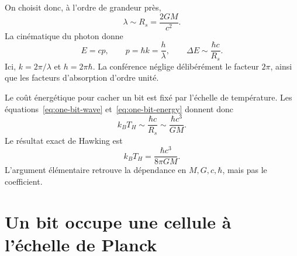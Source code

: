 \begin{classroomqa}
\end{classroomqa}

On choisit donc, à l’ordre de grandeur près,
\begin{equation}
\lambda\sim R_s=\frac{2GM}{c^2}.
\label{eq:one-bit-wave}
\end{equation}
La cinématique du photon donne
\begin{equation}
E=cp,
\qquad
p=\hbar k=\frac{h}{\lambda},
\qquad
\Delta E\sim\frac{\hbar c}{R_s}.
\label{eq:one-bit-energy}
\end{equation}
Ici, \(k=2\pi/\lambda\) et \(h=2\pi\hbar\). La conférence néglige délibérément le facteur \(2\pi\), ainsi que les facteurs d’absorption d’ordre unité.

\begin{classroomqa}
\end{classroomqa}

Le coût énergétique pour cacher un bit est fixé par l’échelle de température. Les équations~\eqref{eq:one-bit-wave} et~\eqref{eq:one-bit-energy} donnent donc
\begin{equation}
k_BT_H\sim\frac{\hbar c}{R_s}
\sim\frac{\hbar c^3}{GM}.
\end{equation}
Le résultat exact de Hawking est
\begin{equation}
k_BT_H=\frac{\hbar c^3}{8\pi GM}.
\end{equation}
L’argument élémentaire retrouve la dépendance en \(M,G,c,\hbar\), mais pas le coefficient.

\section{Un bit occupe une cellule à l’échelle de Planck}

